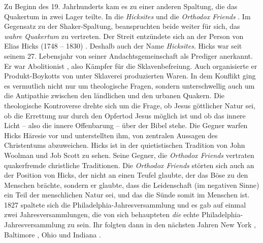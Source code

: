 Zu Beginn des 19. Jahrhunderts kam es zu einer anderen Spaltung, die das
Quakertum in zwei Lager teilte.
In die \textit{Hicksites}  und die
\textit{Orthodox
Friends} . Im Gegensatz zu der Shaker-Spaltung,
beanspruchten beide weiter für
sich, das \textit{wahre Quakertum} zu vertreten. Der Streit entzündete sich an
der Person von Elias Hicks (1748 -- 1830) .
Deshalb
auch der Name \textit{Hicksites}.
Hicks war seit seinem 27. Lebensjahr von seiner Andachtsgemeinschaft als
Prediger
anerkannt. Er war Abolitionist , also Kämpfer
für die Sklavenbefreiung. Auch
organisierte er Produkt-Boykotts von unter Sklaverei produzierten Waren. In dem
Konflikt ging es vermutlich nicht nur um theologische Fragen, sondern
unterschwellig auch um die Antipathie zwischen den ländlichen und den urbanen
Quakern. Die theologische Kontroverse drehte sich um die Frage, ob Jesus
göttlicher Natur sei, ob die Errettung nur durch den Opfertod Jesus möglich ist
und ob das innere Licht  -- also die innere Offenbarung --
über der Bibel  stehe.
Die Gegner warfen Hicks Häresie vor und unterstellten ihm, von zentralen
Aussagen des Christentums abzuweichen. Hicks ist in der quietistischen
 Tradition
von John Woolman  und Job Scott
 zu sehen. Seine Gegner, die \textit{Orthodox
Friends}  vertraten quakerfremde christliche
Traditionen. Die
\textit{Orthodox Friends} störten sich auch an der Position von Hicks, der nicht
an einen Teufel  glaubte, der das Böse zu den Menschen
brächte, sondern er
glaubte, dass die Leidenschaft (im negativen Sinne) ein Teil der menschlichen
Natur sei, und das die Sünde  somit im Menschen ist. 1827 spaltete
sich die
Philadelphia-Jahresversammlung und es gab auf einmal zwei Jahresversammlungen,
die von sich behaupteten \textit{die} echte Philadelphia-Jahresversammlung zu
sein.
Ihr folgten dann in den nächsten Jahren New York ,
Baltimore , Ohio  und
Indiana .

\medskip

